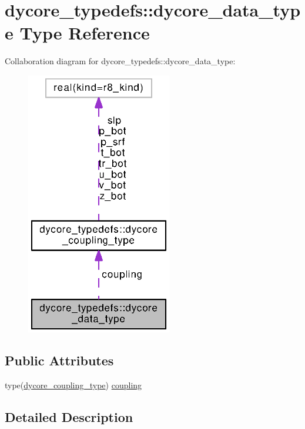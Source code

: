 \section{dycore\-\_\-typedefs\-:\-:dycore\-\_\-data\-\_\-type Type Reference}
\label{structdycore__typedefs_1_1dycore__data__type}


Collaboration diagram for dycore\-\_\-typedefs\-:\-:dycore\-\_\-data\-\_\-type\-:
\nopagebreak
\begin{figure}[H]
\begin{center}
\leavevmode
\includegraphics[width=180pt]{structdycore__typedefs_1_1dycore__data__type__coll__graph}
\end{center}
\end{figure}
\subsection*{Public Attributes}
\begin{DoxyCompactItemize}
\item 
type(\hyperlink{structdycore__typedefs_1_1dycore__coupling__type}{dycore\-\_\-coupling\-\_\-type}) \hyperlink{structdycore__typedefs_1_1dycore__data__type_a6fb0d100c78f2d8decac67ed984d968a}{coupling}
\end{DoxyCompactItemize}


\subsection{Detailed Description}


